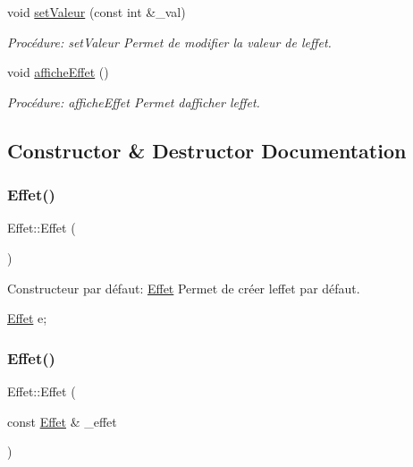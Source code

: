 \begin{DoxyCompactItemize}
void \hyperlink{classEffet_a3d22eeba4c86d9f45e75d64e639d4e37}{set\+Valeur} (const int \&\+\_\+val)
\begin{DoxyCompactList}\small\item\em Procédure\+: set\+Valeur Permet de modifier la valeur de l\textquotesingle{}effet. \end{DoxyCompactList}\item 
void \hyperlink{classEffet_a038370be360fcb5e11f5d654e3506d42}{affiche\+Effet} ()
\begin{DoxyCompactList}\small\item\em Procédure\+: affiche\+Effet Permet d\textquotesingle{}afficher l\textquotesingle{}effet. \end{DoxyCompactList}\end{DoxyCompactItemize}


\subsection{Constructor \& Destructor Documentation}
\mbox{\label{classEffet_a79744b45fc5715a4742e63565d4f89cb}} 
\subsubsection{\texorpdfstring{Effet()}{Effet()}\hspace{0.1cm}{\footnotesize\ttfamily [1/3]}}
{\footnotesize\ttfamily Effet\+::\+Effet (\begin{DoxyParamCaption}{ }\end{DoxyParamCaption})}



Constructeur par défaut\+: \hyperlink{classEffet}{Effet} Permet de créer l\textquotesingle{}effet par défaut. 


\begin{DoxyCode}
\hyperlink{classEffet}{Effet} e;
\end{DoxyCode}
 \mbox{\label{classEffet_a48bc981d19131a8b0b562874d21b014d}} 
\subsubsection{\texorpdfstring{Effet()}{Effet()}\hspace{0.1cm}{\footnotesize\ttfamily [2/3]}}
{\footnotesize\ttfamily Effet\+::\+Effet (\begin{DoxyParamCaption}\item[{const \hyperlink{classEffet}{Effet} \&}]{\+\_\+effet }\end{DoxyParamCaption})}



